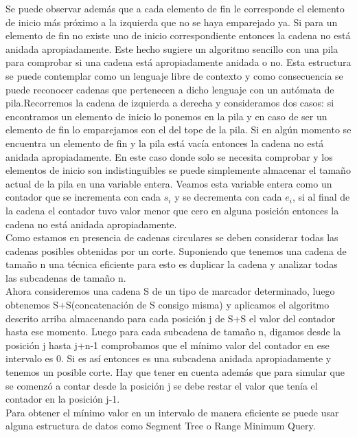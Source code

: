 \documentclass{report}
\begin{document}
Se puede observar adem\'as que a cada elemento de fin le corresponde el elemento de inicio m\'as pr\'oximo a la izquierda que no se haya emparejado ya. Si para un elemento de fin no existe uno de inicio correspondiente entonces la cadena no est\'a anidada apropiadamente.
Este hecho sugiere un algoritmo sencillo con una pila para comprobar si una cadena est\'a apropiadamente anidada o no. Esta estructura se puede contemplar como un lenguaje libre de contexto y como consecuencia se puede reconocer cadenas que pertenecen a dicho lenguaje con un aut\'omata de pila\cite{Gramatica1}\cite{Gramatica2}.Recorremos la cadena de izquierda a derecha y consideramos dos casos: si encontramos un elemento de inicio lo ponemos en la pila y en caso de ser un elemento de fin lo emparejamos con el del tope de la pila. Si en alg\'un momento se encuentra un elemento de fin y la pila est\'a vac\'ia entonces la cadena no est\'a anidada apropiadamente. En este caso donde solo se necesita comprobar y los elementos de inicio son indistinguibles se puede simplemente almacenar el tama\~no actual de la pila en una variable entera. Veamos esta variable entera como un contador que se incrementa con cada $s_i$ y se decrementa con cada $e_i$, si al final de la cadena el contador tuvo valor menor que cero en alguna posici\'on  entonces la cadena no est\'a anidada apropiadamente.\\
Como estamos en presencia de cadenas circulares se deben considerar todas las cadenas posibles obtenidas por un corte. Suponiendo que tenemos una cadena de tama\~no n una t\'ecnica eficiente para esto es duplicar la cadena y analizar todas las subcadenas de tama\~no n.\\
Ahora consideremos una cadena S de un tipo de marcador determinado, luego obtenemos S+S(concatenaci\'on de S consigo misma) y aplicamos el algoritmo descrito arriba almacenando para cada posici\'on j de S+S el valor del contador hasta ese momento. Luego para cada subcadena de tama\~no n, digamos desde la posici\'on j hasta j+n-1 comprobamos que el m\'inimo valor del contador en ese intervalo es 0. Si es as\'i entonces es una subcadena anidada apropiadamente y tenemos un posible corte. Hay que tener en cuenta adem\'as que para simular que se comenz\'o a contar desde la posici\'on j se debe restar el valor que ten\'ia el contador en la posici\'on j-1.\\
Para obtener el m\'inimo valor en un intervalo de manera eficiente se puede usar alguna estructura de datos como Segment Tree o Range Minimum Query\cite{Halim}\cite{SegmentTree}.\\
\end{document}
